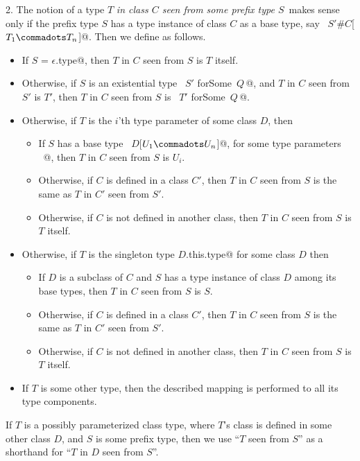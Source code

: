 2. The notion of a type $T$
{\em in class $C$ seen from some prefix type
$S\,$} makes sense only if the prefix type $S$
has a type instance of class $C$ as a base type, say
~\lstinline@$S'$#$C$[$T_1 \commadots T_n$]@. Then we define as follows.
\begin{itemize}
 \item 
  If \lstinline@$S$ = $\epsilon$.type@, then $T$ in $C$ seen from $S$ is $T$ itself.
 \item
  Otherwise, if $S$ is an existential type ~\lstinline@$S'$ forSome {$\,Q\,$}@, and
  $T$ in $C$ seen from $S'$ is $T'$, 
  then $T$ in $C$ seen from $S$ is ~\lstinline@$T'$ forSome {$\,Q\,$}@.
 \item 
   Otherwise, if $T$ is the $i$'th type parameter of some class $D$, then
   \begin{itemize}
   \item
   If $S$ has a base type ~\lstinline@$D$[$U_1 \commadots U_n$]@, for some type parameters
   ~\lstinline@[$U_1 \commadots U_n$]@, then $T$ in $C$ seen from $S$ is $U_i$.
   \item
   Otherwise, if $C$ is defined in a class $C'$, then
   $T$ in $C$ seen from $S$ is the same as $T$ in $C'$ seen from $S'$.
   \item
   Otherwise, if $C$ is not defined in another class, then  
   $T$ in $C$ seen from $S$ is $T$ itself.
  \end{itemize}
\item
   Otherwise, 
   if $T$ is the singleton type \lstinline@$D$.this.type@ for some class $D$
   then
   \begin{itemize}
   \item
   If $D$ is a subclass of $C$ and 
   $S$ has a type instance of class $D$ among its base types,
   then $T$ in $C$ seen from $S$ is $S$.
   \item
   Otherwise, if $C$ is defined in a class $C'$, then
   $T$ in $C$ seen from $S$ is the same as $T$ in $C'$ seen from $S'$.
   \item
   Otherwise, if $C$ is not defined in another class, then  
   $T$ in $C$ seen from $S$ is $T$ itself.
   \end{itemize}
\item
  If $T$ is some other type, then the described mapping is performed
  to all its type components.
\end{itemize}

If $T$ is a possibly parameterized class type, where $T$'s class
is defined in some other class $D$, and $S$ is some prefix type,
then we use ``$T$ seen from $S$'' as a shorthand for
``$T$ in $D$ seen from $S$''.

